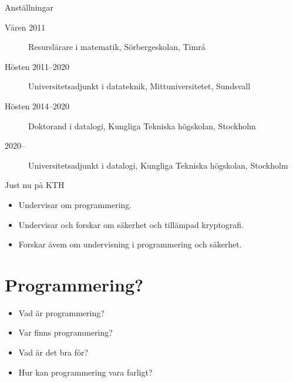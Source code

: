 \begin{frame}
  \begin{block}{Anställningar}
    \begin{description}
      \item[Våren 2011] Resurslärare i matematik, Sörbergeskolan, Timrå
      \item[Hösten 2011--2020] Universitetsadjunkt i datateknik, 
        Mittuniversitetet, Sundsvall
      \item[Hösten 2014--2020] Doktorand i datalogi, Kungliga Tekniska 
        högskolan, Stockholm
      \item[2020--] Universitetsadjunkt i datalogi, Kungliga Tekniska 
        högskolan, Stockholm
    \end{description}
  \end{block}

  \begin{exampleblock}{Just nu på KTH}
    \begin{itemize}
      \item Undervisar om programmering.
      \item Undervisar och forskar om säkerhet och tillämpad kryptografi.
      \item Forskar ävem om undervisning i programmering och säkerhet.
    \end{itemize}
  \end{exampleblock}
\end{frame}

% 
% 

\section{Programmering?}


\begin{frame}
  \begin{question}
    \begin{itemize}
      \item Vad är programmering?
      \item Var finns programmering?
      \item Vad är det bra för?
      \item Hur kan programmering vara farligt?
    \end{itemize}
  \end{question}
\end{frame}

